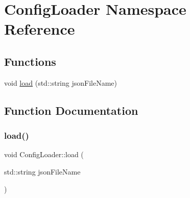\hypertarget{namespace_config_loader}{}\section{Config\+Loader Namespace Reference}
\label{namespace_config_loader}
\subsection*{Functions}
\begin{DoxyCompactItemize}
\item 
void \mbox{\hyperlink{namespace_config_loader_a26cf01adba9411ef1fa006d5068d7cc4}{load}} (std\+::string json\+File\+Name)
\end{DoxyCompactItemize}


\subsection{Function Documentation}
\mbox{\label{namespace_config_loader_a26cf01adba9411ef1fa006d5068d7cc4}} 
\subsubsection{\texorpdfstring{load()}{load()}}
{\footnotesize\ttfamily void Config\+Loader\+::load (\begin{DoxyParamCaption}\item[{std\+::string}]{json\+File\+Name }\end{DoxyParamCaption})}

